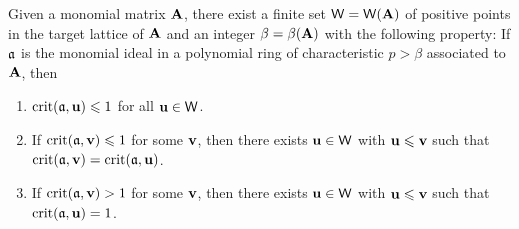 \documentclass{amsart}
\begin{document}
\begin{proposition}
   \label{finite-representatives-small-crits: P}
   Given a monomial matrix $\mathbf{A}$, there exist a finite set $\mathsf{W}=\mathsf{W}(\mathbf{A})$ of positive points in the target lattice of $\mathbf{A}$ and an integer $\beta = \beta(\mathbf{A})$ with the following property\textup:
   If $\mathfrak{a}$ is the monomial ideal in a polynomial ring of characteristic $p>\beta$ associated to $\mathbf{A}$, then 
   \begin{enumerate}[$(1)$]
      \item $\operatorname{crit}(\mathfrak{a},\mathbf{u}) \leqslant 1$ for all $\mathbf{u} \in \mathsf{W}$.
      \item If $\operatorname{crit}(\mathfrak{a},\mathbf{v}) \leqslant 1$ for some $\mathbf{v}$, then there exists $\mathbf{u} \in \mathsf{W}$ with $\mathbf{u} \leqslant \mathbf{v}$ such that $\operatorname{crit}(\mathfrak{a},\mathbf{v}) = \operatorname{crit}(\mathfrak{a},\mathbf{u})$.
      \item If $\operatorname{crit}(\mathfrak{a},\mathbf{v}) > 1$ for some $\mathbf{v}$, then there exists $\mathbf{u} \in \mathsf{W}$ with $\mathbf{u}\leqslant \mathbf{v}$ such that $\operatorname{crit}(\mathfrak{a}, \mathbf{u}) = 1$.
   \end{enumerate}
\end{proposition}
\end{document}
